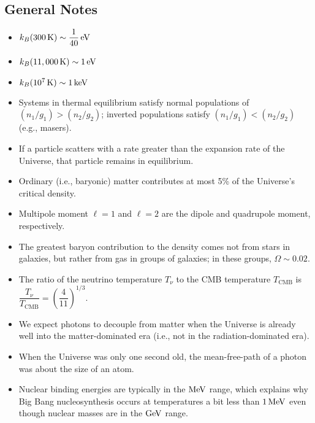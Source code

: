 \documentclass[a4paper,10pt]{article}
\begin{document}

\newpage
\subsection{General Notes}

\begin{itemize}
    \item $k_B(300\,\mathrm{K}) \sim \dfrac{1}{40}\,{\rm eV}$
    \item $k_B(11,000\,\mathrm{K}) \sim 1\,{\rm eV}$
    \item $k_B(10^7\,\mathrm{K}) \sim 1\,{\rm keV}$
    \item Systems in thermal equilibrium satisfy normal populations of $(n_1/g_1)>(n_2/g_2)$; inverted populations satisfy $(n_1/g_1)<(n_2/g_2)$ (e.g., masers).
    \item If a particle scatters with a rate greater than the expansion rate of the Universe, that particle remains in equilibrium.
    \item Ordinary (i.e., baryonic) matter contributes at most 5\% of the Universe's critical density.
    \item Multipole moment $\ell=1$ and $\ell=2$ are the dipole and quadrupole moment, respectively.
    \item The greatest baryon contribution to the density comes not from stars in galaxies, but rather from gas in groups of galaxies; in these groups, $\Omega\sim0.02$.
    \item The ratio of the neutrino temperature $T_\nu$ to the CMB temperature $T_\mathrm{CMB}$ is $\dfrac{T_\nu}{T_\mathrm{CMB}} = \left( \dfrac{4}{11} \right)^{1/3}$.
    \item We expect photons to decouple from matter when the Universe is already well into the matter-dominated era (i.e., not in the radiation-dominated era).
    \item When the Universe was only one second old, the mean-free-path of a photon was about the size of an atom.
    \item Nuclear binding energies are typically in the $\rm{MeV}$ range, which explains why Big Bang nucleosynthesis occurs at temperatures a bit less than $1\,\rm{MeV}$ even though nuclear masses are in the $\rm{GeV}$ range.

\end{itemize}
\end{document}
